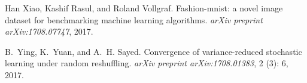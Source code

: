 \begin{thebibliography}{42}
Han Xiao, Kashif Rasul, and Roland Vollgraf.
\newblock Fashion-mnist: a novel image dataset for benchmarking machine
  learning algorithms.
\newblock \emph{arXiv preprint arXiv:1708.07747}, 2017.

B.~Ying, K.~Yuan, and A.~H. Sayed.
\newblock Convergence of variance-reduced stochastic learning under random
  reshuffling.
\newblock \emph{arXiv preprint arXiv:1708.01383}, 2 (3): 6,
  2017.

\end{thebibliography}
